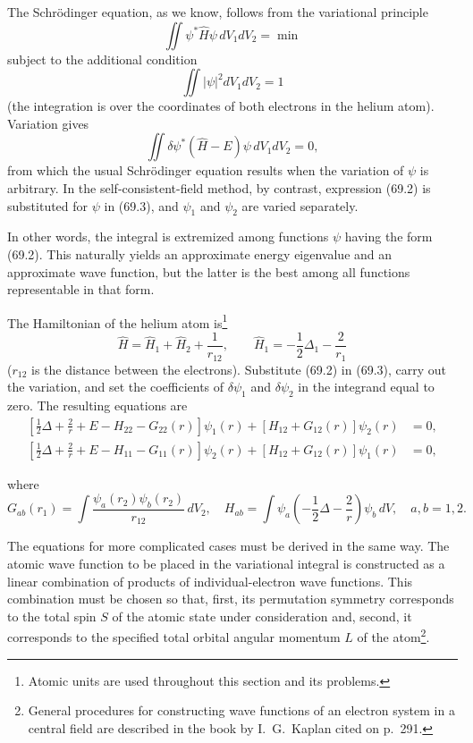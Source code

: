 The Schrödinger equation, as we know, follows from the variational principle
\[
 \iint\psi^*\hat H\psi\,dV_1dV_2=\min
\]
subject to the additional condition
\[
 \iint|\psi|^2dV_1dV_2=1
\]
(the integration is over the coordinates of both electrons in the helium atom). Variation gives
\begin{equation}
 \iint\delta\psi^*(\hat H-E)\psi\,dV_1dV_2=0,
 \tag{69.3}
\end{equation}
from which the usual Schrödinger equation results when the variation of $\psi$ is arbitrary. In the self-consistent-field method, by contrast, expression (69.2) is substituted for $\psi$ in (69.3), and $\psi_1$ and $\psi_2$ are varied separately.

In other words, the integral is extremized among functions $\psi$ having the form (69.2). This naturally yields an approximate energy eigenvalue and an approximate wave function, but the latter is the best among all functions representable in that form.

The Hamiltonian of the helium atom is\footnote{Atomic units are used throughout this section and its problems.}
\begin{equation}
 \hat H=\hat H_1+\hat H_2+\frac1{r_{12}},\qquad \hat H_1=-\frac12\Delta_1-\frac2{r_1}
 \tag{69.4}
\end{equation}
($r_{12}$ is the distance between the electrons). Substitute (69.2) in (69.3), carry out the variation, and set the coefficients of $\delta\psi_1$ and $\delta\psi_2$ in the integrand equal to zero. The resulting equations are
\begin{equation}
\begin{split}
 [\tfrac12\Delta+\tfrac2r+E-H_{22}-G_{22}(r)]\psi_1(r)+[H_{12}+G_{12}(r)]\psi_2(r)&=0,\\
 [\tfrac12\Delta+\tfrac2r+E-H_{11}-G_{11}(r)]\psi_2(r)+[H_{12}+G_{12}(r)]\psi_1(r)&=0,
\end{split}\tag{69.5}
\end{equation}

where
\begin{equation}
 G_{ab}(r_1)=\int\frac{\psi_a(r_2)\psi_b(r_2)}{r_{12}}\,dV_2,\quad
 H_{ab}=\int\psi_a\left(-\frac12\Delta-\frac2r\right)\psi_b\,dV,\quad a,b=1,2.
 \tag{69.6}
\end{equation}


The equations for more complicated cases must be derived in the same way. The atomic wave function to be placed in the variational integral is constructed as a linear combination of products of individual-electron wave functions. This combination must be chosen so that, first, its permutation symmetry corresponds to the total spin $S$ of the atomic state under consideration and, second, it corresponds to the specified total orbital angular momentum $L$ of the atom\footnote{General procedures for constructing wave functions of an electron system in a central field are described in the book by I.~G.~Kaplan cited on p.~291.}.

